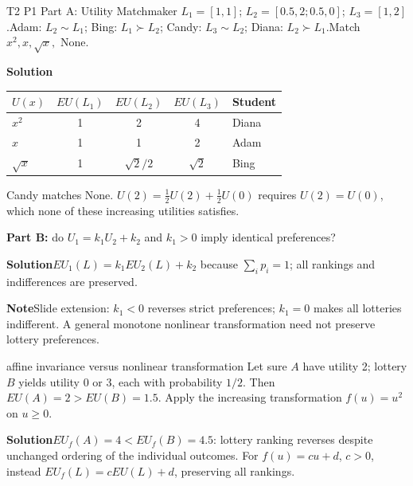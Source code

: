 \documentclass[10pt,a4paper]{article}
\newcommand{\ans}{\par\smallskip\textbf{\color{good}Solution\quad}}
\newcommand{\pit}{\par\smallskip\textbf{\color{warn}Note\quad}}
\begin{document}
\begin{question}{T2 P1 Part A: Utility Matchmaker}\label{q:t2p1}
$L_1=[1,1]$; $L_2=[0.5,2;0.5,0]$; $L_3=[1,2]$.Adam: $L_2\sim L_1$; Bing: $L_1\succ L_2$; Candy: $L_3\sim L_2$; Diana: $L_2\succ L_1$.Match $x^2,x,\sqrt{x},$ None.
\ans
\begin{center}
\begin{tabular}{@{}lccc l@{}}
\toprule $U(x)$ & $EU(L_1)$ & $EU(L_2)$ & $EU(L_3)$ & Student \\\midrule
$x^2$ & 1 & 2 & 4 & Diana \\
$x$ & 1 & 1 & 2 & Adam \\
$\sqrt{x}$ & 1 & $\sqrt2/2$ & $\sqrt2$ & Bing \\\bottomrule
\end{tabular}
\end{center}
Candy matches None. $U(2)=\frac12U(2)+\frac12U(0)$ requires $U(2)=U(0)$, which none of these increasing utilities satisfies.

\tcbbreak
\textbf{Part B:} do $U_1=k_1U_2+k_2$ and $k_1>0$ imply identical preferences?
\ans $EU_1(L)=k_1EU_2(L)+k_2$ because $\sum_i p_i=1$; all rankings and indifferences are preserved.
\pit Slide extension: $k_1<0$ reverses strict preferences; $k_1=0$ makes all lotteries indifferent. A general monotone nonlinear transformation need not preserve lottery preferences.
\end{question}

\begin{question}{affine invariance versus nonlinear transformation}
Let sure $A$ have utility 2; lottery $B$ yields utility 0 or 3, each with probability $1/2$. Then $EU(A)=2>EU(B)=1.5$. Apply the increasing transformation $f(u)=u^2$ on $u\ge0$.
\ans $EU_f(A)=4< EU_f(B)=4.5$: lottery ranking reverses despite unchanged ordering of the individual outcomes. For $f(u)=cu+d$, $c>0$, instead $EU_f(L)=cEU(L)+d$, preserving all rankings.
\end{question}
\end{document}
